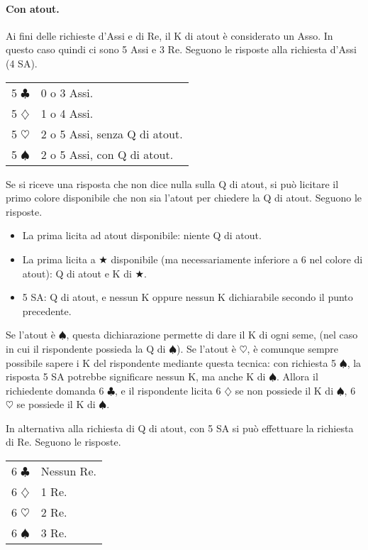 \documentclass[a4paper,10pt]{article}
\renewcommand{\c}{$\clubsuit$\xspace}
\renewcommand{\d}{$\diamondsuit$\xspace}
\newcommand{\h}{$\heartsuit$\xspace}
\newcommand{\s}{$\spadesuit$\xspace}
\renewcommand{\j}{$\bigstar$\xspace}
\newcommand{\sa}{SA\xspace}
\newcommand{\smallspace}{\vskip0.3cm}
\newenvironment{twocol}
  {\smallspace\noindent\begin{tabular}{l p{0.78\textwidth}}}
  {\end{tabular}\smallspace}
\begin{document}
\paragraph{Con atout.} Ai fini delle richieste d'Assi e di Re, il K di atout \`e considerato un Asso. In questo caso quindi ci sono 5 Assi e 3 Re. Seguono le risposte alla richiesta d'Assi (4 \sa).
\begin{twocol}
5 \c & 0 o 3 Assi.\\
5 \d & 1 o 4 Assi.\\
5 \h & 2 o 5 Assi, senza Q di atout.\\
5 \s & 2 o 5 Assi, con Q di atout.\\
\end{twocol}

\noindent Se si riceve una risposta che non dice nulla sulla Q di atout, si può licitare il primo colore disponibile che non sia l'atout per chiedere la Q di atout. Seguono le risposte.

\begin{itemize}
 \item La prima licita ad atout disponibile: niente Q di atout.
 \item La prima licita a \j disponibile (ma necessariamente inferiore a 6 nel colore di atout): Q di atout e K di \j.
 \item 5 \sa: Q di atout, e nessun K oppure nessun K dichiarabile secondo il punto precedente.
\end{itemize}

Se l'atout è \s, questa dichiarazione permette di dare il K di ogni seme, (nel caso in cui il rispondente possieda la Q di \s). Se l'atout è \h, è comunque sempre possibile sapere i K del rispondente mediante questa tecnica: con richiesta 5 \s, la risposta 5 \sa potrebbe significare nessun K, ma anche K di \s.
Allora il richiedente domanda 6 \c, e il rispondente licita 6 \d se non possiede il K di \s, 6 \h se possiede il K di \s.


\smallspace

\noindent In alternativa alla richiesta di Q di atout, con 5 \sa si può effettuare la richiesta di Re. Seguono le risposte.

\begin{twocol}
6 \c & Nessun Re.\\
6 \d & 1 Re.\\
6 \h & 2 Re.\\
6 \s & 3 Re. \\
\end{twocol}
\end{document}
